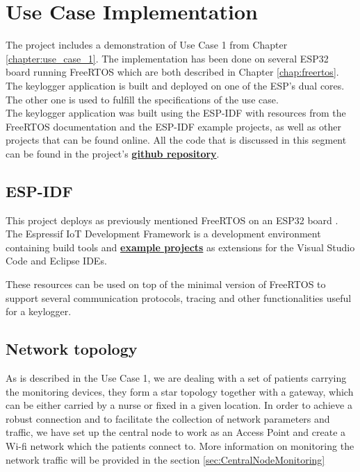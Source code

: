 \chapter{Use Case Implementation}

The project includes a demonstration of Use Case 1 from Chapter \ref{chapter:use_case_1}. The implementation has been done on several ESP32 board running FreeRTOS which are both described in Chapter \ref{chap:freertos}. The keylogger application is built and deployed on one of the ESP's dual cores. The other one is used to fulfill the specifications of the use case. \\

The keylogger application was built using the ESP-IDF with resources from the FreeRTOS documentation and the ESP-IDF example projects, as well as other projects that can be found online. All the code that is discussed in this segment can be found in the project's \href{https://github.com/C4ES-PoliTO/FreeRTOS-Monitoring}{\textbf{github repository}}.

\section{ESP-IDF}
This project deploys as previously mentioned FreeRTOS on an ESP32 board \cite{manual:ESP-IDF}. The Espressif IoT Development Framework is a development environment containing build tools and \hyperlink{https://github.com/espressif/esp-idf/tree/master/examples}{\textbf{example projects}} as extensions for the Visual Studio Code and Eclipse IDEs. 

These resources can be used on top of the minimal version of FreeRTOS to support several communication protocols, tracing and other functionalities useful for a keylogger.

\section{Network topology}
As is described in the Use Case 1, we are dealing with a set of patients carrying the monitoring devices, they form a star topology together with a gateway, which can be either carried by a nurse or fixed in a given location. In order to achieve a robust connection and to facilitate the collection of network parameters and traffic, we have set up the central node to work as an Access Point and create a Wi-fi network which the patients connect to. More information on monitoring the network traffic will be provided in the section \ref{sec:CentralNodeMonitoring}

